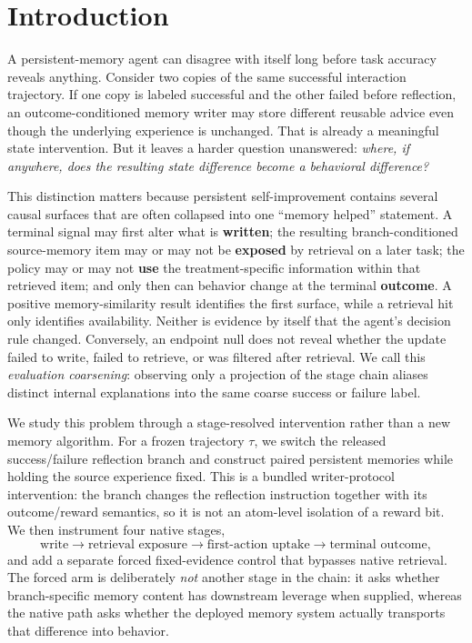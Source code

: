 \section{Introduction}
A persistent-memory agent can disagree with itself long before task accuracy reveals anything. Consider two copies of the same successful interaction trajectory. If one copy is labeled successful and the other failed before reflection, an outcome-conditioned memory writer may store different reusable advice even though the underlying experience is unchanged. That is already a meaningful state intervention. But it leaves a harder question unanswered: \emph{where, if anywhere, does the resulting state difference become a behavioral difference?}

This distinction matters because persistent self-improvement contains several causal surfaces that are often collapsed into one ``memory helped'' statement. A terminal signal may first alter what is \textbf{written}; the resulting branch-conditioned source-memory item may or may not be \textbf{exposed} by retrieval on a later task; the policy may or may not \textbf{use} the treatment-specific information within that retrieved item; and only then can behavior change at the terminal \textbf{outcome}. A positive memory-similarity result identifies the first surface, while a retrieval hit only identifies availability. Neither is evidence by itself that the agent's decision rule changed. Conversely, an endpoint null does not reveal whether the update failed to write, failed to retrieve, or was filtered after retrieval. We call this \emph{evaluation coarsening}: observing only a projection of the stage chain aliases distinct internal explanations into the same coarse success or failure label.

We study this problem through a stage-resolved intervention rather than a new memory algorithm. For a frozen trajectory $\tau$, we switch the released success/failure reflection branch and construct paired persistent memories while holding the source experience fixed. This is a bundled writer-protocol intervention: the branch changes the reflection instruction together with its outcome/reward semantics, so it is not an atom-level isolation of a reward bit. We then instrument four native stages,
\[
\text{write} \rightarrow \text{retrieval exposure} \rightarrow \text{first-action uptake} \rightarrow \text{terminal outcome},
\]
and add a separate forced fixed-evidence control that bypasses native retrieval. The forced arm is deliberately \emph{not} another stage in the chain: it asks whether branch-specific memory content has downstream leverage when supplied, whereas the native path asks whether the deployed memory system actually transports that difference into behavior.

